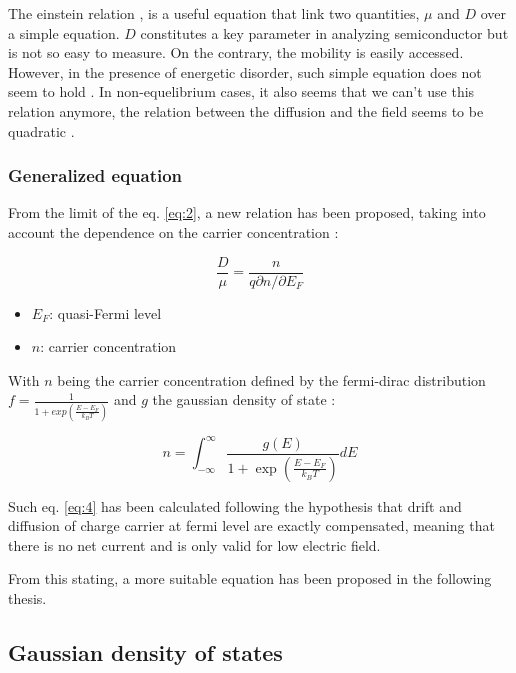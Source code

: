 The einstein relation \cite{einstein}, is a useful equation that link two quantities, $\mu$ and $D$ over a simple equation. $D$ constitutes a key parameter in analyzing semiconductor but is not so easy to measure. On the contrary, the mobility is easily accessed. However, in the presence of energetic disorder, such simple equation does not seem to hold \cite{ein_drift,ein_drift_2}. In non-equelibrium cases, it also seems that we can't use this relation anymore, the relation between the diffusion and the field seems to be quadratic \cite{diffusion_F}.

\subsubsection{Generalized equation}

From the limit of the eq. \ref{eq:2}, a new relation has been proposed, taking into account the dependence on the carrier concentration \cite{generalied_quasi}:

\begin{equation}
    \frac{D}{\mu}=\frac{n}{q \partial n / \partial E_{F}}
    \label{eq:3}
\end{equation}

\begin{itemize}
    \setlength\itemsep{0.0em}
    \item $E_F$: quasi-Fermi level
    \item $n$: carrier concentration
\end{itemize}

With $n$ being the carrier concentration defined by the fermi-dirac distribution $f = \frac{1}{1 + exp\left(\frac{E - E_F}{k_BT}\right)}$ and $g$ the gaussian density of state \cite{generalied_quasi}:

\begin{equation}
    n=\int_{-\infty}^{\infty} \frac{g(E)}{1+\exp \left(\frac{E-E_{F}}{k_{B} T}\right)} d E
    \label{eq:4}
\end{equation}

Such eq. \ref{eq:4} has been calculated following the hypothesis that drift and diffusion of charge carrier at fermi level are exactly compensated, meaning that there is no net current and is only valid for low electric field.

From this stating, a more suitable equation has been proposed in the following thesis.

\subsection{Gaussian density of states}

